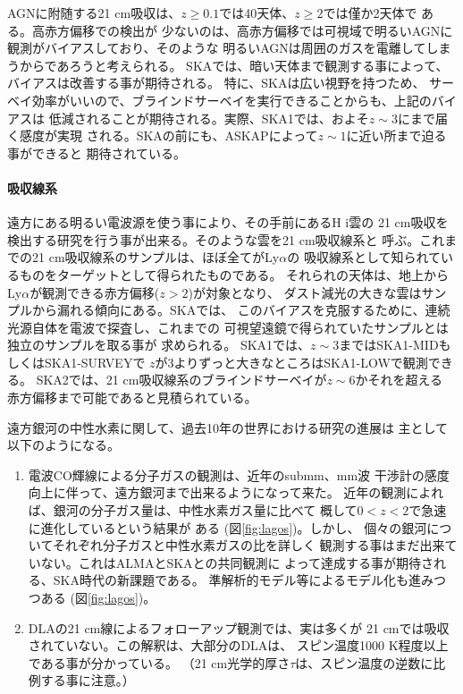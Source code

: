 AGNに附随する21 cm吸収は、$z\geq 0.1$では40天体、$z\geq 2$では僅か2天体で
ある\citep{1991PhRvL..67.3328U,1999ApJ...510L..87M}。高赤方偏移での検出が
少ないのは、高赤方偏移では可視域で明るいAGNに観測がバイアスしており、そのような
明るいAGNは周囲のガスを電離してしまうからであろうと考えられる\citep{2012ApJ...759..117C}。
SKAでは、暗い天体まで観測する事によって、バイアスは改善する事が期待される。
特に、SKAは広い視野を持つため、
サーベイ効率がいいので、ブラインドサーベイを実行できることからも、上記のバイアスは
低減されることが期待される。実際、SKA1では、およそ$z\sim 3$にまで届く感度が実現
される。SKAの前にも、ASKAPによって$z\sim 1$に近い所まで迫る事ができると
期待されている。

\paragraph{吸収線系}
遠方にある明るい電波源を使う事により、その手前にあるH {\sc i}雲の
21 cm吸収を検出する研究を行う事が出来る。そのような雲を21 cm吸収線系と
呼ぶ。これまでの21 cm吸収線系のサンプルは、ほぼ全てがLy$\alpha$の
吸収線系として知られているものをターゲットとして得られたものである。
それられの天体は、地上からLy$\alpha$が観測できる赤方偏移($z>2$)が対象となり、
ダスト減光の大きな雲はサンプルから漏れる傾向にある。SKAでは、
このバイアスを克服するために、連続光源自体を電波で探査し、これまでの
可視望遠鏡で得られていたサンプルとは独立のサンプルを取る事が
求められる。
SKA1では、$z\sim 3$まではSKA1-MIDもしくはSKA1-SURVEYで
$z$が3よりずっと大きなところはSKA1-LOWで観測できる。
SKA2では、21 cm吸収線系のブラインドサーベイが$z\sim 6$かそれを超える
赤方偏移まで可能であると見積られている\citep{2004NewAR..48.1259K}。

遠方銀河の中性水素に関して、過去10年の世界における研究の進展は
主として以下のようになる。
\begin{enumerate}
\item 電波CO輝線による分子ガスの観測は、近年のsubmm、mm波
干渉計の感度向上に伴って、遠方銀河まで出来るようになって来た。
近年の観測によれば、銀河の分子ガス量は、中性水素ガス量に比べて
概して$0<z<2$で急速に進化しているという結果が
ある\citep{2011MNRAS.418.1649L} (図\ref{fig:lagos})。しかし、
個々の銀河についてそれぞれ分子ガスと中性水素ガスの比を詳しく
観測する事はまだ出来ていない。これはALMAとSKAとの共同観測に
よって達成する事が期待される、SKA時代の新課題である。
準解析的モデル等によるモデル化も進みつつある\citep{2011MNRAS.418.1649L}
(図\ref{fig:lagos})。
\item DLAの21 cm線によるフォローアップ観測では、実は多くが
21 cmでは吸収されていない。この解釈は、大部分のDLAは、
スピン温度1000 K程度以上である事が分かっている\citep{2014MNRAS.438.2131K}。
（21 cm光学的厚さ$\tau$は、スピン温度の逆数に比例する事に注意。）
\end{enumerate}

